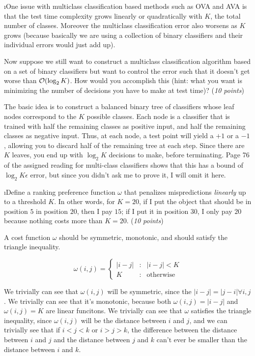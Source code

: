 \documentclass[fleqn]{article}
\begin{document}
\i One issue with multiclass classification based methods such as OVA
and AVA is that the test time complexity grows 
linearly or quadratically with $K$, the total number of classes. Moreover
the multiclass classification error also worsens as $K$ grows (because
basically we are using a collection of binary classifiers and their individual
errors would just add up). 

Now suppose we still want to construct a multiclass classification algorithm
based on a set of binary classifiers but want to control the error such that
it doesn't get worse than $\mathcal{O}(\log_2 K)$. How would you accomplish this (hint:
what you want is minimizing the number of decisions you have to make at test time)?
(\emph{10 points})

\begin{solution}
The basic idea is to construct a balanced binary tree of classifiers whose leaf nodes correspond to the $K$ possible classes. Each node is a classifier that is trained with half the remaining classes as positive input, and half the remaining classes as negative input. Thus, at each node, a test point will yield a $+1$ or a $-1$, allowing you to discard half of the remaining tree at each step. Since there are $K$ leaves, you end up with $\log_2 K$ decisions to make, before terminating. Page 76 of the assigned reading for multi-class classifiers shows that this has a bound of $\log_2 K \epsilon$ error, but since you didn't ask me to prove it, I will omit it here.
\end{solution}

\i Define a ranking preference function $\omega$ that penalizes
mispredictions \emph{linearly} up to a threshold $K$.  In other
words, for $K=20$, if I put the object that should be in position
$5$ in position $20$, then I pay $15$; if I put it in position
$30$, I only pay $20$ because nothing costs more than $K=20$.
(\emph{10 points})

\begin{solution}

A cost function $\omega$ should be symmetric, monotonic, and should satisfy the triangle inequality. 

\begin{displaymath}
   \omega(i,j) = \left\{
     \begin{array}{lrl}
       |i-j| & : & |i-j| < K\\
       K & : & \text{otherwise}
     \end{array}
   \right.
\end{displaymath}

We trivially can see that $\omega(i,j)$ will be symmetric, since the $|i-j| = |j-i| \forall i,j$. We trivially can see that it's monotonic, because both $\omega(i,j) = |i-j|$ and $\omega(i,j) = K$ are linear funcitons. We trivially can see that $\omega$ satisfies the triangle inequality, since $\omega(i,j)$ will be the distance between $i$ and $j$, and we can trivially see that if $i < j < k$ or $i > j > k$, the difference between the distance between $i$ and $j$ and the distance between $j$ and $k$ can't ever be smaller than the distance between $i$ and $k$.

\end{solution}
\end{document}
